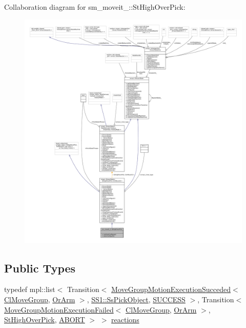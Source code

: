 Collaboration diagram for sm\+\_\+moveit\+\_\+:\+:St\+High\+Over\+Pick\+:
\nopagebreak
\begin{figure}[H]
\begin{center}
\leavevmode
\includegraphics[width=350pt]{structsm__moveit__3_1_1StHighOverPick__coll__graph}
\end{center}
\end{figure}
\subsection*{Public Types}
\begin{DoxyCompactItemize}
\item 
typedef mpl\+::list$<$ Transition$<$ \hyperlink{structmoveit__z__client_1_1MoveGroupMotionExecutionSucceded}{Move\+Group\+Motion\+Execution\+Succeded}$<$ \hyperlink{classmoveit__z__client_1_1ClMoveGroup}{Cl\+Move\+Group}, \hyperlink{classsm__moveit__3_1_1OrArm}{Or\+Arm} $>$, \hyperlink{structsm__moveit__3_1_1SS1_1_1SsPickObject}{S\+S1\+::\+Ss\+Pick\+Object}, \hyperlink{classSUCCESS}{S\+U\+C\+C\+E\+SS} $>$, Transition$<$ \hyperlink{structmoveit__z__client_1_1MoveGroupMotionExecutionFailed}{Move\+Group\+Motion\+Execution\+Failed}$<$ \hyperlink{classmoveit__z__client_1_1ClMoveGroup}{Cl\+Move\+Group}, \hyperlink{classsm__moveit__3_1_1OrArm}{Or\+Arm} $>$, \hyperlink{structsm__moveit__3_1_1StHighOverPick}{St\+High\+Over\+Pick}, \hyperlink{classABORT}{A\+B\+O\+RT} $>$ $>$ \hyperlink{structsm__moveit__3_1_1StHighOverPick_a040b8ba065c27d3103b57f449a3b637f}{reactions}
\end{DoxyCompactItemize}
